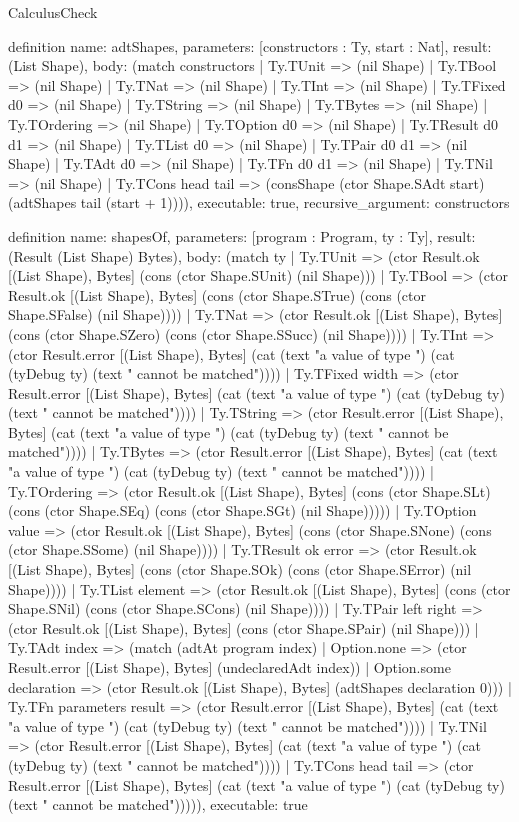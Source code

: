 \begin{lexlean}{CalculusCheck}
\begin{semanticmodule}
definition{
  name: adtShapes,
  parameters: [constructors : Ty, start : Nat],
  result: (List Shape),
  body: (match constructors
    | Ty.TUnit => (nil Shape)
    | Ty.TBool => (nil Shape)
    | Ty.TNat => (nil Shape)
    | Ty.TInt => (nil Shape)
    | Ty.TFixed d0 => (nil Shape)
    | Ty.TString => (nil Shape)
    | Ty.TBytes => (nil Shape)
    | Ty.TOrdering => (nil Shape)
    | Ty.TOption d0 => (nil Shape)
    | Ty.TResult d0 d1 => (nil Shape)
    | Ty.TList d0 => (nil Shape)
    | Ty.TPair d0 d1 => (nil Shape)
    | Ty.TAdt d0 => (nil Shape)
    | Ty.TFn d0 d1 => (nil Shape)
    | Ty.TNil => (nil Shape)
    | Ty.TCons head tail => (consShape (ctor Shape.SAdt start) (adtShapes tail (start + 1)))),
  executable: true,
  recursive_argument: constructors
}

definition{
  name: shapesOf,
  parameters: [program : Program, ty : Ty],
  result: (Result (List Shape) Bytes),
  body: (match ty
    | Ty.TUnit => (ctor Result.ok [(List Shape), Bytes] (cons (ctor Shape.SUnit) (nil Shape)))
    | Ty.TBool => (ctor Result.ok [(List Shape), Bytes] (cons (ctor Shape.STrue) (cons (ctor Shape.SFalse) (nil Shape))))
    | Ty.TNat => (ctor Result.ok [(List Shape), Bytes] (cons (ctor Shape.SZero) (cons (ctor Shape.SSucc) (nil Shape))))
    | Ty.TInt => (ctor Result.error [(List Shape), Bytes] (cat (text "a value of type ") (cat (tyDebug ty) (text " cannot be matched"))))
    | Ty.TFixed width => (ctor Result.error [(List Shape), Bytes] (cat (text "a value of type ") (cat (tyDebug ty) (text " cannot be matched"))))
    | Ty.TString => (ctor Result.error [(List Shape), Bytes] (cat (text "a value of type ") (cat (tyDebug ty) (text " cannot be matched"))))
    | Ty.TBytes => (ctor Result.error [(List Shape), Bytes] (cat (text "a value of type ") (cat (tyDebug ty) (text " cannot be matched"))))
    | Ty.TOrdering => (ctor Result.ok [(List Shape), Bytes] (cons (ctor Shape.SLt) (cons (ctor Shape.SEq) (cons (ctor Shape.SGt) (nil Shape)))))
    | Ty.TOption value => (ctor Result.ok [(List Shape), Bytes] (cons (ctor Shape.SNone) (cons (ctor Shape.SSome) (nil Shape))))
    | Ty.TResult ok error => (ctor Result.ok [(List Shape), Bytes] (cons (ctor Shape.SOk) (cons (ctor Shape.SError) (nil Shape))))
    | Ty.TList element => (ctor Result.ok [(List Shape), Bytes] (cons (ctor Shape.SNil) (cons (ctor Shape.SCons) (nil Shape))))
    | Ty.TPair left right => (ctor Result.ok [(List Shape), Bytes] (cons (ctor Shape.SPair) (nil Shape)))
    | Ty.TAdt index => (match (adtAt program index)
      | Option.none => (ctor Result.error [(List Shape), Bytes] (undeclaredAdt index))
      | Option.some declaration => (ctor Result.ok [(List Shape), Bytes] (adtShapes declaration 0)))
    | Ty.TFn parameters result => (ctor Result.error [(List Shape), Bytes] (cat (text "a value of type ") (cat (tyDebug ty) (text " cannot be matched"))))
    | Ty.TNil => (ctor Result.error [(List Shape), Bytes] (cat (text "a value of type ") (cat (tyDebug ty) (text " cannot be matched"))))
    | Ty.TCons head tail => (ctor Result.error [(List Shape), Bytes] (cat (text "a value of type ") (cat (tyDebug ty) (text " cannot be matched"))))),
  executable: true
}


\end{semanticmodule}
\end{lexlean}
